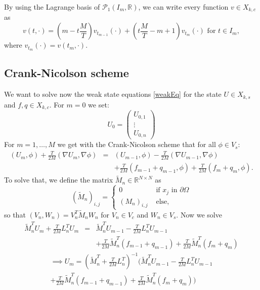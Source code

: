 By using the Lagrange basis of $\mathcal{P}_1(I_m,\mathbb{R})$, we can write every function $v\in X_{k,c}$ as
\begin{displaymath}
v(t,\cdot)=\left(m-t\frac{M}{T}\right) v_{t_{m-1}}(\cdot)+\left(t\frac{M}{T}-m+1\right) v_{t_m}(\cdot)\text{ for }t\in I_m,
\end{displaymath}
where $v_{t_m}(\cdot)=v(t_m,\cdot)$.


\subsection{Crank-Nicolson scheme}
We want to solve now the weak state equations \eqref{weakEq} for the state $U\in X_{k,s}$ and $f,q\in X_{k,c}$. For $m=0$ we set:
\begin{displaymath}
U_0=\begin{pmatrix} U_{0,1} \\ \vdots \\ U_{0,n} \end{pmatrix}
\end{displaymath}
For $m=1,\dotsc,M$ we get with the Crank-Nicolson scheme that for all $\phi\in V_s$:
\begin{eqnarray*}
(U_m,\phi) + \frac{T}{2M}(\nabla U_m, \nabla \phi) & = &(U_{m-1},\phi) - \frac{T}{2M}(\nabla U_{m-1}, \nabla \phi)\\
&& + \frac{T}{2M}(f_{m-1} + q_{m-1}, \phi) + \frac{T}{2M}(f_m + q_m, \phi).
\end{eqnarray*}
To solve that, we define the matrix $\tilde{M}_n\in\mathbb{R}^{N\times N}$ as
\begin{displaymath}
\left(\tilde{M}_n\right)_{i,j}=\begin{cases}
0 & \text{ if $x_j$ in $\partial\Omega$}\\
\left(M_n\right)_{i,j} & \text{ else,}
\end{cases}
\end{displaymath}
so that $(V_n,W_n)=V_n^T\tilde{M}_nW_n$ for $V_n\in V_c$ and $W_n\in V_s$. Now we solve
\begin{eqnarray*}
\tilde{M}_n^TU_m + \frac{T}{2M} L_n^T U_m &=& \tilde{M}_n^TU_{m-1} - \frac{T}{2M} L_n^T U_{m-1}\\
&& + \frac{T}{2M} \tilde{M}_n^T (f_{m-1} + q_{m-1}) + \frac{T}{2M} \tilde{M}_n^T (f_m + q_m)
\end{eqnarray*}
\begin{multline}
\label{crank_nicolson}
\implies U_m = \left(\tilde{M}_n^T + \frac{T}{2M} L_n^T\right)^{-1} \bigg( \tilde{M}_n^TU_{m-1} - \frac{T}{2M} L_n^T U_{m-1}\\
 + \frac{T}{2M} \tilde{M}_n^T (f_{m-1} + q_{m-1}) + \frac{T}{2M} \tilde{M}_n^T (f_m + q_m)\bigg)
\end{multline}

